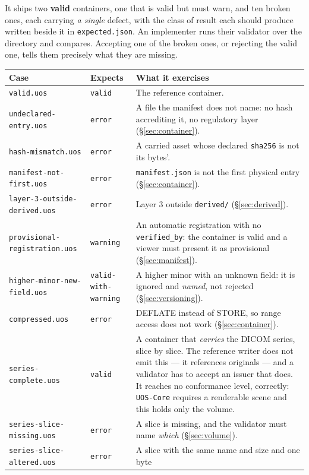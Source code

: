 \documentclass[11pt,a4paper]{article}
\newcommand{\code}[1]{\texttt{\small #1}}
\begin{document}
It ships two \textbf{valid} containers, one that is valid but must warn, and ten broken ones, each carrying \emph{a single}
defect, with the class of result each should produce written beside it in
\code{expected.json}. An implementer runs their validator over the directory and compares.
Accepting one of the broken ones, or rejecting the valid one, tells them precisely what
they are missing.

\begin{longtable}{L{6.3cm} L{2.2cm} L{6.5cm}}
\toprule
\textbf{Case} & \textbf{Expects} & \textbf{What it exercises}\\
\midrule
\endhead
\code{valid.uos} & \code{valid} & The reference container.\\
\code{undeclared-entry.uos} & \code{error} & A file the manifest does not name: no hash
accrediting it, no regulatory layer (\S\ref{sec:container}).\\
\code{hash-mismatch.uos} & \code{error} & A carried asset whose declared \code{sha256} is not
its bytes'.\\
\code{manifest-not-first.uos} & \code{error} & \code{manifest.json} is not the first
physical entry (\S\ref{sec:container}).\\
\code{layer-3-outside-derived.uos} & \code{error} & Layer 3 outside \code{derived/}
(\S\ref{sec:derived}).\\
\code{provisional-registration.uos} & \code{warning} & An automatic registration with no
\code{verified\_by}: the container is valid and a viewer must present it as provisional
(\S\ref{sec:manifest}).\\
\code{higher-minor-new-field.uos} & \code{valid-with-warning} & A higher minor with an unknown
field: it is ignored and \emph{named}, not rejected (\S\ref{sec:versioning}).\\
\code{compressed.uos} & \code{error} & DEFLATE instead of STORE, so range access does not work
(\S\ref{sec:container}).\\
\code{series-complete.uos} & \code{valid} & A container that \emph{carries} the DICOM series, slice
by slice. The reference writer does not emit this --- it references originals --- and a
validator has to accept an issuer that does. It reaches no conformance level, correctly:
\code{UOS-Core} requires a renderable scene and this holds only the volume.\\
\code{series-slice-missing.uos} & \code{error} & A slice is missing, and the validator must name
\emph{which} (\S\ref{sec:volume}).\\
\code{series-slice-altered.uos} & \code{error} & A slice with the same name and size and one byte

\end{longtable}
\end{document}
